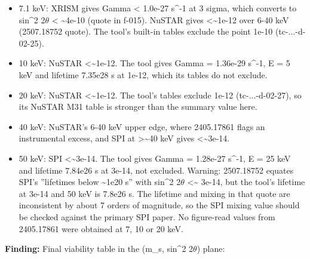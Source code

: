 \documentclass[11pt,a4paper]{article}
\begin{document}
\begin{itemize}
  \item 7.1 keV: XRISM gives Gamma \textless{} 1.0e-27 s\textasciicircum{}-1 at 3 sigma, which converts to sin\textasciicircum{}2 2$\theta$ \textless{} \textasciitilde{}4e-10 (quote in f-015). NuSTAR gives \textless{}\textasciitilde{}1e-12 over 6-40 keV (2507.18752 quote). The tool's built-in tables exclude the point 1e-10 (tc-...-d-02-25).
  \item 10 keV: NuSTAR \textless{}\textasciitilde{}1e-12. The tool gives Gamma = 1.36e-29 s\textasciicircum{}-1, E = 5 keV and lifetime 7.35e28 s at 1e-12, which its tables do not exclude.
  \item 20 keV: NuSTAR \textless{}\textasciitilde{}1e-12. The tool's tables exclude 1e-12 (tc-...-d-02-27), so its NuSTAR M31 table is stronger than the summary value here.
  \item 40 keV: NuSTAR's 6-40 keV upper edge, where 2405.17861 flags an instrumental excess, and SPI at \textgreater{}\textasciitilde{}40 keV gives \textless{}\textasciitilde{}3e-14.
  \item 50 keV: SPI \textless{}\textasciitilde{}3e-14. The tool gives Gamma = 1.28e-27 s\textasciicircum{}-1, E = 25 keV and lifetime 7.84e26 s at 3e-14, not excluded.
Warning: 2507.18752 equates SPI's ''lifetimes below \textasciitilde{}1e20 s'' with sin\textasciicircum{}2 2$\theta$ \textless{}\textasciitilde{} 3e-14, but the tool's lifetime at 3e-14 and 50 keV is 7.8e26 s. The lifetime and mixing in that quote are inconsistent by about 7 orders of magnitude, so the SPI mixing value should be checked against the primary SPI paper. No figure-read values from 2405.17861 were obtained at 7, 10 or 20 keV.

\end{itemize}
\textbf{Finding:} Final viability table in the (m\_s, sin\textasciicircum{}2 2$\theta$) plane:
\end{document}
